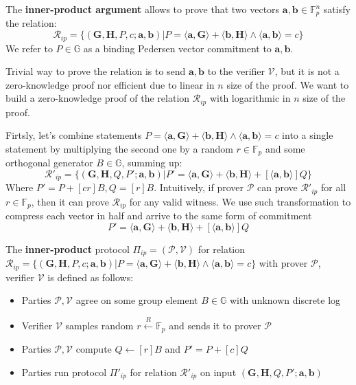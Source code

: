\documentclass[../lecture-notes-148x210.tex]{subfiles}
\begin{document}
The \textbf{inner-product argument} allows to prove that two vectors $\mathbf{a,b} \in \mathbb{F}_p^n$ satisfy the relation:
$$\mathcal{R}_{ip} = \{ (\mathbf{G,H}, P, c; \mathbf{a,b}) \vert P = \langle \mathbf{a,G} \rangle + \langle \mathbf{b,H} \rangle \wedge \langle \mathbf{a,b} \rangle = c \}$$
We refer to $P \in \mathbb{G}$ as a binding Pedersen vector commitment to $\mathbf{a,b}$.

Trivial way to prove the relation is to send $\mathbf{a,b}$ to the verifier $\mathcal{V}$, but it is not a zero-knowledge proof nor efficient due to linear in $n$ size of the proof. We want to build a zero-knowledge proof of the relation $\mathcal{R}_{ip}$ with logarithmic in $n$ size of the proof.

Firtsly, let's combine statements $P = \langle \mathbf{a,G} \rangle + \langle \mathbf{b,H} \rangle \wedge \langle \mathbf{a,b} \rangle = c$ into a single statement by multiplying the second one by a random $r \in \mathbb{F}_p$ and some orthogonal generator $B \in \mathbb{G}$, summing up:
$$
\mathcal{R}'_{ip} = \{ (\mathbf{G,H}, Q, P'; \mathbf{a,b}) \vert P' = \langle \mathbf{a,G} \rangle + \langle \mathbf{b,H} \rangle + [\langle \mathbf{a,b} \rangle]Q \}
$$
Where $P' = P + [cr]B, Q=[r]B$. Intuitively, if prover $\mathcal{P}$ can prove $\mathcal{R}'_{ip}$ for all $r \in \mathbb{F}_p$, then it can prove $\mathcal{R}_{ip}$ for any valid witness. We use such transformation to compress each vector in half and arrive to the same form of commitment
$$P' = \langle \mathbf{a,G} \rangle + \langle \mathbf{b,H} \rangle + [\langle \mathbf{a,b} \rangle]Q$$

\begin{definition}
    The \textbf{inner-product} protocol $\Pi_{ip} = (\mathcal{P}, \mathcal{V})$ for relation $\mathcal{R}_{ip} = \{ (\mathbf{G,H}, P, c; \mathbf{a,b}) \vert P = \langle \mathbf{a,G} \rangle + \langle \mathbf{b,H} \rangle \wedge \langle \mathbf{a,b} \rangle = c \}$ with prover $\mathcal{P}$, verifier $\mathcal{V}$ is defined as follows:
    \begin{itemize}
        \item Parties $\mathcal{P, V}$ agree on some group element $B \in \mathbb{G}$ with unknown discrete log
        \item Verifier $\mathcal{V}$ samples random $r \xleftarrow{R} \mathbb{F}_p$ and sends it to prover $\mathcal{P}$
        \item Parties $\mathcal{P, V}$ compute $Q \gets [r]B$ and $P' = P + [c]Q$
        \item Parties run protocol $\Pi'_{ip}$ for relation $\mathcal{R}'_{ip}$ on input $(\mathbf{G,H}, Q, P'; \mathbf{a,b})$
    \end{itemize}
\end{definition}
\end{document}
